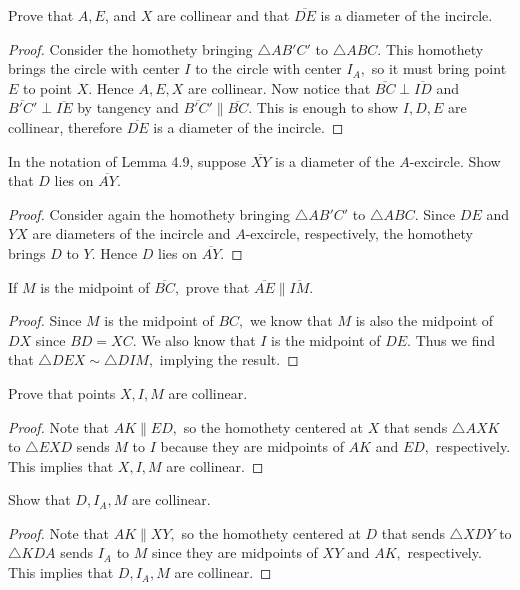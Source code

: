 \documentclass[letterpaper,oneside]{scrartcl}
\providecommand{\ol}{\overline}
\begin{document}
\begin{problem*}
  [4.8]
  Prove that $A, E$, and $X$ are collinear and that $\ol{DE}$ is a diameter of the incircle. 
\end{problem*}
\begin{proof}
  Consider the homothety bringing $\triangle AB'C'$ to $\triangle ABC.$ This homothety brings the circle with center $I$ to the circle with center $I_A,$ so it must bring point $E$ to point $X.$ Hence $A,E,X$ are collinear. Now notice that $\ol{BC} \perp \ol{ID}$ and $\ol{B'C'} \perp \ol{IE}$ by tangency and $\ol{B'C'} \parallel \ol{BC}.$ This is enough to show $I,D,E$ are collinear, therefore $\ol{DE}$ is a diameter of the incircle. 
\end{proof}

\begin{lemma*}
  In the notation of Lemma 4.9, suppose $\ol{XY}$ is a diameter of the $A$-excircle. Show that $D$ lies on $\ol{AY}.$
\end{lemma*}
\begin{proof}
  Consider again the homothety bringing $\triangle AB'C'$ to $\triangle ABC.$ Since $DE$ and $YX$ are diameters of the incircle and $A$-excircle, respectively, the homothety brings $D$ to $Y.$ Hence $D$ lies on $\ol{AY}.$
\end{proof}

\begin{problem*}
  [4.11]
  If $M$ is the midpoint of $\ol{BC},$ prove that $\ol{AE} \parallel \ol{IM}.$
\end{problem*}
\begin{proof}
  Since $M$ is the midpoint of $BC,$ we know that $M$ is also the midpoint of $DX$ since $BD=XC.$ We also know that $I$ is the midpoint of $DE.$ Thus we find that $\triangle DEX \sim \triangle DIM,$ implying the result. 
\end{proof}

\begin{problem*}
  [4.12]
  Prove that points $X,I,M$ are collinear.
\end{problem*}
\begin{proof}
  Note that $AK \parallel ED,$ so the homothety centered at $X$ that sends $\triangle AXK$ to $\triangle EXD$ sends $M$ to $I$ because they are midpoints of $AK$ and $ED,$ respectively. This implies that $X,I,M$ are collinear.
\end{proof}

\begin{problem*}
  [4.13]
  Show that $D,I_A,M$ are collinear.
\end{problem*}
\begin{proof}
  Note that $AK \parallel XY,$ so the homothety centered at $D$ that sends $\triangle XDY$ to $\triangle KDA$ sends $I_A$ to $M$ since they are midpoints of $XY$ and $AK,$ respectively. This implies that $D,I_A,M$ are collinear.
\end{proof}
\end{document}
